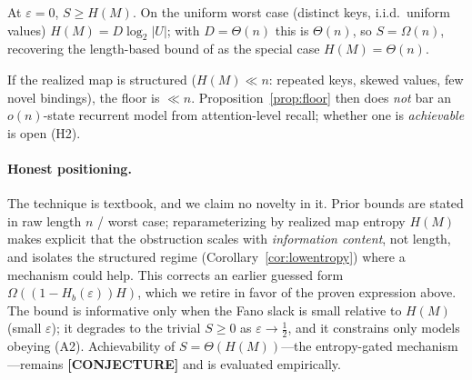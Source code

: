 \begin{corollary}
\label{cor:recover}
At $\varepsilon=0$, $S\ge H(M)$. On the uniform worst case (distinct keys, i.i.d.\ uniform
values) $H(M)=D\log_2|U|$; with $D=\Theta(n)$ this is $\Theta(n)$, so $S=\Omega(n)$, recovering the
length-based bound of \citet{arora2024based} as the special case $H(M)=\Theta(n)$.
\end{corollary}

\begin{corollary}
\label{cor:lowentropy}
If the realized map is structured ($H(M)\ll n$: repeated keys, skewed values, few novel
bindings), the floor is $\ll n$. Proposition~\ref{prop:floor} then does \emph{not} bar an $o(n)$-state
recurrent model from attention-level recall; whether one is \emph{achievable} is open (H2).
\end{corollary}

\paragraph{Honest positioning.}
The technique is textbook, and we claim no novelty in it. Prior bounds
\citep{arora2024based,jelassi2024copying,wen2025rnns} are stated in raw length $n$ / worst case;
reparameterizing by realized map entropy $H(M)$ makes explicit that the obstruction scales with
\emph{information content}, not length, and isolates the structured regime
(Corollary~\ref{cor:lowentropy}) where a mechanism could help. This corrects an earlier guessed
form $\Omega((1-H_b(\varepsilon))H)$, which we retire in favor of the proven expression above. The
bound is informative only when the Fano slack is small relative to $H(M)$ (small $\varepsilon$);
it degrades to the trivial $S\ge 0$ as $\varepsilon\to\tfrac12$, and it constrains only models
obeying (A2). Achievability of $S=\Theta(H(M))$---the entropy-gated mechanism---remains
\textbf{[CONJECTURE]} and is evaluated empirically.
